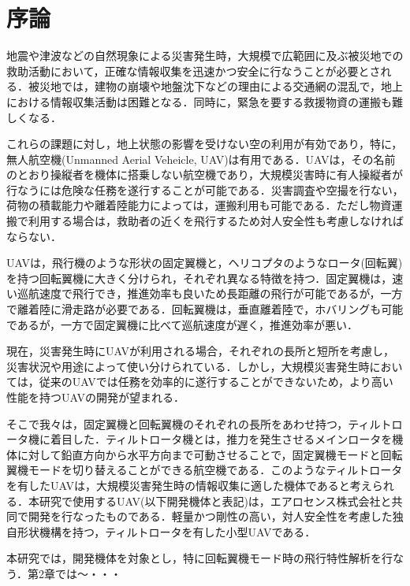 
\chapter{序論}
\label{intro}

地震や津波などの自然現象による災害発生時，大規模で広範囲に及ぶ被災地での救助活動において，正確な情報収集を迅速かつ安全に行なうことが必要とされる．被災地では，建物の崩壊や地盤沈下などの理由による交通網の混乱で，地上における情報収集活動は困難となる．同時に，緊急を要する救援物資の運搬も難しくなる．

これらの課題に対し，地上状態の影響を受けない空の利用が有効であり，特に，無人航空機(Unmanned Aerial Veheicle, UAV)は有用である．UAVは，その名前のとおり操縦者を機体に搭乗しない航空機であり，大規模災害時に有人操縦者が行なうには危険な任務を遂行することが可能である．災害調査や空撮を行ない，荷物の積載能力や離着陸能力によっては，運搬利用も可能である．ただし物資運搬で利用する場合は，救助者の近くを飛行するため対人安全性も考慮しなければならない．

UAVは，飛行機のような形状の固定翼機と，ヘリコプタのようなロータ(回転翼)を持つ回転翼機に大きく分けられ，それぞれ異なる特徴を持つ．固定翼機は，速い巡航速度で飛行でき，推進効率も良いため長距離の飛行が可能であるが，一方で離着陸に滑走路が必要である．回転翼機は，垂直離着陸で，ホバリングも可能であるが，一方で固定翼機に比べて巡航速度が遅く，推進効率が悪い．

現在，災害発生時にUAVが利用される場合，それぞれの長所と短所を考慮し，災害状況や用途によって使い分けられている．しかし，大規模災害発生時においては，従来のUAVでは任務を効率的に遂行することができないため，より高い性能を持つUAVの開発が望まれる．

そこで我々は，固定翼機と回転翼機のそれぞれの長所をあわせ持つ，ティルトロータ機に着目した．ティルトロータ機とは，推力を発生させるメインロータを機体に対して鉛直方向から水平方向まで可動させることで，固定翼機モードと回転翼機モードを切り替えることができる航空機である．このようなティルトロータを有したUAVは，大規模災害発生時の情報収集に適した機体であると考えられる．本研究で使用するUAV(以下開発機体と表記)は，エアロセンス株式会社と共同で開発を行なったものである．軽量かつ剛性の高い，対人安全性を考慮した独自形状機構を持つ，ティルトロータを有した小型UAVである．

本研究では，開発機体を対象とし，特に回転翼機モード時の飛行特性解析を行なう．第2章では〜・・・
